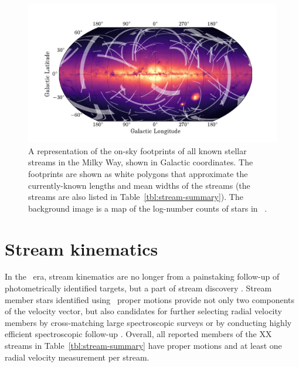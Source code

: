\documentclass[final,5p,times,twocolumn,authoryear]{elsarticle}
\begin{document}
\begin{figure}[t!]
\begin{center}
\includegraphics[width=1\textwidth]{stream-sky-map.pdf}
\end{center}
\caption{%
A representation of the on-sky footprints of all known stellar streams in the Milky Way,
shown in Galactic coordinates.
The footprints are shown as white polygons that approximate the currently-known lengths
and mean widths of the streams (the streams are also listed in
Table~\ref{tbl:stream-summary}).
The background image is a map of the log-number counts of stars in \gaia\ .
\label{fig:sky-map}
}
\end{figure}


\section{Stream kinematics}
\label{sec:orbits}
In the \gaia\ era, stream kinematics are no longer from a painstaking follow-up of photometrically identified targets, but a part of stream discovery \citep[e.g.,][]{malhan:2018b, malhan:2019, ibata:2018, ibata:2019, ibata:2021, grillmair:2019, grillmair:2022}.
Stream member stars identified using \gaia\ proper motions provide not only two components of the velocity vector, but also candidates for further selecting radial velocity members by cross-matching large spectroscopic surveys \citep[e.g.,][]{huang:2019, yang:2022, ibata:2023} or by conducting highly efficient spectroscopic follow-up \citep[e.g.,][]{li:2019, bonaca:2020b}.
Overall, all reported members of the XX streams in Table~\ref{tbl:stream-summary} have proper motions and at least one radial velocity measurement per stream.
\end{document}
